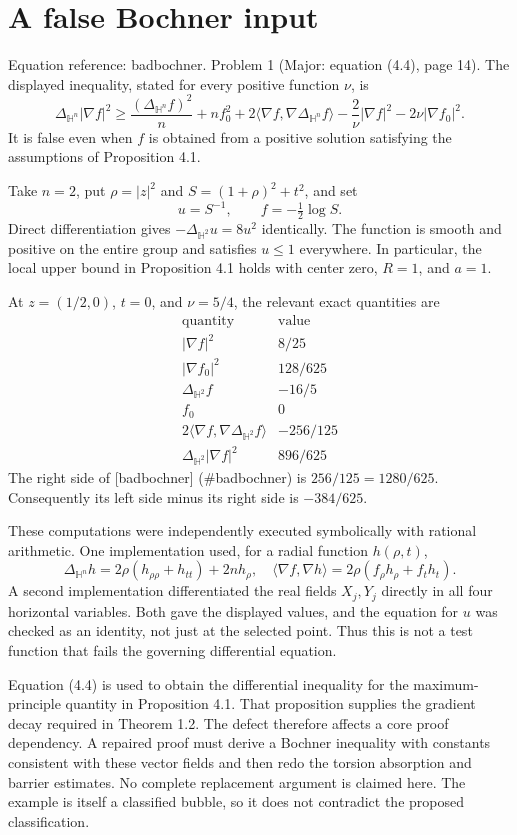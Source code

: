 \documentclass[10pt]{article}
\begin{document}
\section*{A false Bochner input}
Equation reference: badbochner. Problem 1 (Major: equation (4.4), page 14).  The displayed inequality, stated for every positive function \(\nu\), is \[
 \Delta_{\mathbb H^n}|\nabla f|^2\geq
 \frac{(\Delta_{\mathbb H^n}f)^2}{n}+nf_0^2+
 2\langle\nabla f,\nabla\Delta_{\mathbb H^n}f\rangle
 -\frac2\nu|\nabla f|^2-2\nu|\nabla f_0|^2.\] It is false even when \(f\) is obtained from a positive solution satisfying the assumptions of Proposition 4.1.\par
Take \(n=2\), put \(\rho=|z|^2\) and \(S=(1+\rho)^2+t^2\), and set \[u=S^{-1},\qquad f=-\tfrac12\log S.\] Direct differentiation gives \(-\Delta_{\mathbb H^2}u=8u^2\) identically. The function is smooth and positive on the entire group and satisfies \(u\leq1\) everywhere. In particular, the local upper bound in Proposition 4.1 holds with center zero, \(R=1\), and \(a=1\).\par
At \(z=(1/2,0)\), \(t=0\), and \(\nu=5/4\), the relevant exact quantities are \[\begin{array}{c|c}
\text{quantity}&\text{value}\\ \hline
|\nabla f|^2&8/25\\
|\nabla f_0|^2&128/625\\
\Delta_{\mathbb H^2}f&-16/5\\
f_0&0\\
2\langle\nabla f,\nabla\Delta_{\mathbb H^2}f\rangle&-256/125\\
\Delta_{\mathbb H^2}|\nabla f|^2&896/625
\end{array}\] The right side of [badbochner] (\#badbochner) is \(256/125=1280/625\). Consequently its left side minus its right side is \(-384/625\).\par
These computations were independently executed symbolically with rational arithmetic. One implementation used, for a radial function \(h(\rho,t)\), \[\Delta_{\mathbb H^n}h=2\rho(h_{\rho\rho}+h_{tt})+2nh_\rho,\quad
 \langle\nabla f,\nabla h\rangle
 =2\rho(f_\rho h_\rho+f_th_t).\] A second implementation differentiated the real fields \(X_j,Y_j\) directly in all four horizontal variables. Both gave the displayed values, and the equation for \(u\) was checked as an identity, not just at the selected point. Thus this is not a test function that fails the governing differential equation.\par
Equation (4.4) is used to obtain the differential inequality for the maximum-principle quantity in Proposition 4.1. That proposition supplies the gradient decay required in Theorem 1.2. The defect therefore affects a core proof dependency. A repaired proof must derive a Bochner inequality with constants consistent with these vector fields and then redo the torsion absorption and barrier estimates. No complete replacement argument is claimed here. The example is itself a classified bubble, so it does not contradict the proposed classification.\par
\end{document}
